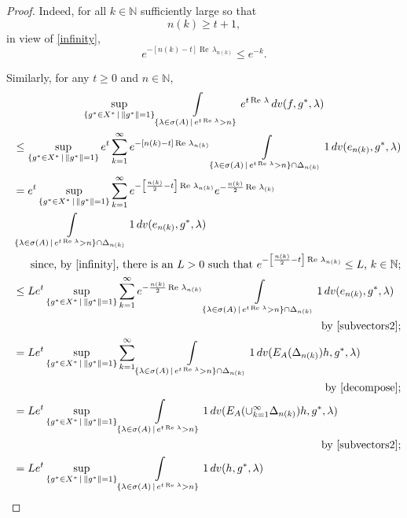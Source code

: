 \documentclass{amsart}
\theoremstyle{plain}
\theoremstyle{definition}
\begin{document}
\begin{proof}
Indeed, for all $k\in {{\mathbb N}}$ sufficiently large so that
\[
n(k)\ge t+1,
\]
in view of \eqref{infinity}, 
\[
e^{-[n(k)-t]\operatorname{Re\,}\lambda_{n(k)}}\le e^{-k}.
\]

Similarly, for any $t\ge 0$ and $n\in{{\mathbb N}}$,
\begin{multline}\label{second2}
\sup_{\{g^*\in X^*\,|\,\|g^*\|=1\}}
\int\limits_{\left\{\lambda\in\sigma(A)\,\middle|\,e^{t\operatorname{Re\,}\lambda}>n\right\}}e^{t\operatorname{Re\,}\lambda}\,dv(f,g^*,\lambda)
\\
\shoveleft{
\le \sup_{\{g^*\in X^*\,|\,\|g^*\|=1\}}e^t\sum_{k=1}^\infty e^{-[n(k)-t]\operatorname{Re\,}\lambda_{n(k)}}
\int\limits_{\left\{\lambda\in\sigma(A)\,\middle|\,e^{t\operatorname{Re\,}\lambda}>n\right\}\cap \Delta_{n(k)}}1\,dv(e_{n(k)},g^*,\lambda)
}\\
\shoveleft{
=e^t\sup_{\{g^*\in X^*\,|\,\|g^*\|=1\}}\sum_{k=1}^\infty e^{-\left[\frac{n(k)}{2}-t\right]\operatorname{Re\,}\lambda_{n(k)}}
e^{-\frac{n(k)}{2}\operatorname{Re\,}\lambda_{(k)}}
}\\
\shoveleft{
\int\limits_{\left\{\lambda\in\sigma(A)\,\middle|\,e^{t\operatorname{Re\,}\lambda}>n\right\}\cap \Delta_{n(k)}}1\,dv(e_{n(k)},g^*,\lambda)
}\\
\hfill
\text{since, by \eqref{infinity}, there is an $L>0$ such that
$e^{-\left[\frac{n(k)}{2}-t\right]\operatorname{Re\,}\lambda_{n(k)}}\le L$, $k\in{{\mathbb N}}$;}
\\
\shoveleft{
\le Le^t\sup_{\{g^*\in X^*\,|\,\|g^*\|=1\}}\sum_{k=1}^\infty e^{-\frac{n(k)}{2}\operatorname{Re\,}\lambda_{n(k)}}
\int\limits_{\left\{\lambda\in\sigma(A)\,\middle|\,e^{t\operatorname{Re\,}\lambda}>n\right\}\cap \Delta_{n(k)}}1\,dv(e_{n(k)},g^*,\lambda)
}\\
\hfill
\text{by \eqref{subvectors2};}
\\
\shoveleft{
= Le^t\sup_{\{g^*\in X^*\,|\,\|g^*\|=1\}}\sum_{k=1}^\infty
\int\limits_{\left\{\lambda\in\sigma(A)\,\middle|\,e^{t\operatorname{Re\,}\lambda}>n\right\}\cap \Delta_{n(k)}}1\,dv(E_A(\Delta_{n(k)})h,g^*,\lambda)
}\\
\hfill
\text{by \eqref{decompose};}
\\
\shoveleft{
= Le^t\sup_{\{g^*\in X^*\,|\,\|g^*\|=1\}}
\int\limits_{\left\{\lambda\in\sigma(A)\,\middle|\,e^{t\operatorname{Re\,}\lambda}>n\right\}}1\,dv(E_A(\cup_{k=1}^\infty\Delta_{n(k)})h,g^*,\lambda)
}\\
\hfill
\text{by \eqref{subvectors2};}
\\
\shoveleft{
=Le^t\sup_{\{g^*\in X^*\,|\,\|g^*\|=1\}}\int\limits_{\{\lambda\in\sigma(A)\,|\,e^{t\operatorname{Re\,}\lambda}>n\}}1\,dv(h,g^*,\lambda)
}
\end{multline}
\end{proof}
\end{document}
